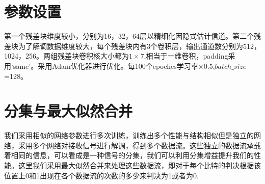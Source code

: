 \documentclass[UTF8]{article}
\begin{document}
\section{参数设置}
第一个残差块维度较小，分别为16，32，64层以精细化因隐式估计信道。第二个残差块为了解调数据维度较大，每个残差块内有3个卷积层，输出通道数分别为512，1024，256。两组残差块卷积核大小都为$1\times 7$,相当于一维卷积，padding采用`same'。采用Adam优化器进行优化。每100个epoches学习率$\times$0.5,$batch\_ size$=128。
\section{分集与最大似然合并}
我们采用相似的网络参数进行多次训练，训练出多个性能与结构相似但是独立的网络，采用多个网络对接收信号进行解调，得到多个数据流。这些独立的数据流承载着相同的信息，可以看成是一种信号的分集，我们可以利用分集增益提升我们的性能。这里我们采用最大似然合并来处理这些数据流，即对于每个比特的判决根据该位置上0和1出现在各个数据流的次数的多少来判决为1或者为0.
\end{document}
